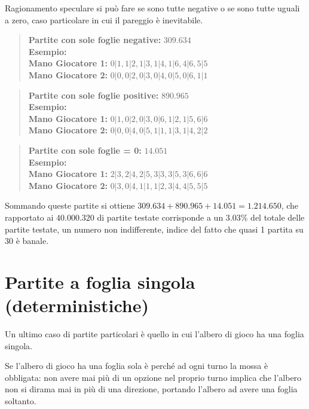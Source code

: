 \documentclass[a4paper,12pt]{report}
\begin{document}
Ragionamento speculare si può fare se sono tutte negative o se sono tutte uguali a zero, caso particolare in cui il pareggio è inevitabile.


\begin{quote}
    \textbf{Partite con sole foglie negative:} \(309.634\)\\
    \textbf{Esempio:} \(\)\\
    \textbf{Mano Giocatore 1:} \(0|1, 1|2, 1|3, 1|4, 1|6, 4|6, 5|5\)\\
    \textbf{Mano Giocatore 2:} \(0|0, 0|2, 0|3, 0|4, 0|5, 0|6, 1|1\)
\end{quote}


\begin{quote}
    \textbf{Partite con sole foglie positive:} \(890.965\)\\
    \textbf{Esempio:} \(\)\\
    \textbf{Mano Giocatore 1:} \(0|1, 0|2, 0|3, 0|6, 1|2, 1|5, 6|6\)\\
    \textbf{Mano Giocatore 2:} \(0|0, 0|4, 0|5, 1|1, 1|3, 1|4, 2|2\)
\end{quote}


\begin{quote}
    \textbf{Partite con sole foglie = 0:} \(14.051 \)\\
    \textbf{Esempio:} \(\)\\
    \textbf{Mano Giocatore 1:} \(2|3, 2|4, 2|5, 3|3, 3|5, 3|6, 6|6\)\\
    \textbf{Mano Giocatore 2:} \(0|3, 0|4, 1|1, 1|2, 3|4, 4|5, 5|5\)
\end{quote}

Sommando queste partite si ottiene \(309.634 + 890.965 + 14.051 = 1.214.650 \), che rapportato ai \( 40.000.320 \) di partite testate corrisponde a un \( 3.03 \% \) del totale delle partite testate, un numero non indifferente, indice del fatto che quasi 1 partita su 30 è banale.


\section{Partite a foglia singola (deterministiche)}

Un ultimo caso di partite particolari è quello in cui l'albero di gioco ha una foglia singola.

Se l'albero di gioco ha una foglia sola è perché ad ogni turno la mossa è obbligata: non avere mai più di un opzione nel proprio turno implica che l'albero non si dirama mai in più di una direzione, portando l'albero ad avere una foglia soltanto.
\end{document}
